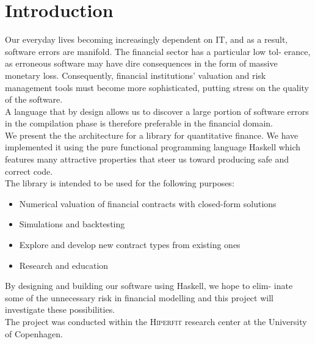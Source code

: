 \chapter{Introduction}

Our everyday lives becoming increasingly dependent on IT, and as a result,
software errors are manifold. The financial sector has a particular low tol-
erance, as erroneous software may have dire consequences in the form of
massive monetary loss. Consequently, financial institutions' valuation and risk
management tools must become more sophisticated, putting stress on the quality
of the software.\\

A language that by design allows us to discover a large portion of software
errors in the compilation phase is therefore preferable in the financial domain.\\

We present the the architecture for a library for quantitative finance. We have
implemented it using the pure functional programming language Haskell which
features many attractive properties that steer us toward producing safe and
correct code.\\

The library is intended to be used for the following purposes:\\

\begin{itemize}
\item Numerical valuation of financial contracts with closed-form solutions
\item Simulations and backtesting
\item Explore and develop new contract types from existing ones
\item Research and education
\end{itemize}

By designing and building our software using Haskell, we hope to elim-
inate some of the unnecessary risk in financial modelling and this project
will investigate these possibilities.\\

The project was conducted within the \textsc{Hiperfit} research center at the
University of Copenhagen.\cite{Haskell}
